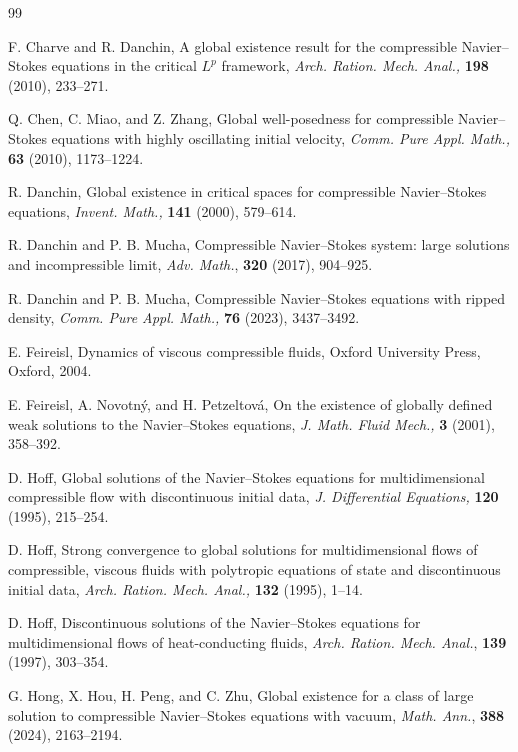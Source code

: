 \documentclass[11pt]{article}
\begin{document}
\begin{thebibliography}{99}

F. Charve and R. Danchin, A global existence result for the compressible Navier--Stokes equations in the critical $L^p$ framework, \textit{Arch. Ration. Mech. Anal.,} \textbf{198} (2010), 233--271.

Q. Chen, C. Miao, and Z. Zhang, Global well-posedness for compressible Navier--Stokes equations with highly oscillating initial velocity, {\it Comm. Pure Appl. Math.,} \textbf{63} (2010), 1173--1224.

R. Danchin, Global existence in critical spaces for compressible Navier--Stokes equations, {\it Invent. Math.,} \textbf{141} (2000), 579--614.

R. Danchin and P. B. Mucha, Compressible Navier--Stokes system: large solutions and incompressible limit, {\it Adv. Math.}, {\bf320} (2017), 904--925.

R. Danchin and P. B. Mucha, Compressible Navier--Stokes equations with ripped density, {\it Comm. Pure Appl. Math.,} \textbf{76} (2023), 3437--3492.

 E. Feireisl,
Dynamics of viscous compressible fluids,
Oxford University Press, Oxford, 2004.

E. Feireisl, A. Novotn\'{y}, and H. Petzeltov\'a, On the existence of globally defined weak solutions to the Navier--Stokes equations, \textit{J. Math. Fluid Mech.,} \textbf{3} (2001), 358--392.

D. Hoff, Global solutions of the Navier--Stokes equations for multidimensional compressible flow with discontinuous initial data, \textit{J. Differential Equations,} \textbf{120} (1995), 215--254.

D. Hoff, Strong convergence to global solutions for multidimensional flows of compressible, viscous fluids with polytropic equations of state and discontinuous initial data, \textit{Arch. Ration. Mech. Anal.,} \textbf{132} (1995), 1--14.

 D. Hoff,
Discontinuous solutions of the Navier--Stokes equations for multidimensional flows of heat-conducting fluids,
{\it Arch. Ration. Mech. Anal.}, {\bf 139} (1997), 303--354.

 G. Hong, X. Hou, H. Peng, and C. Zhu,
Global existence for a class of large solution to compressible Navier--Stokes equations with vacuum,
{\it Math. Ann.}, {\bf 388} (2024), 2163--2194.


\end{thebibliography}
\end{document}
